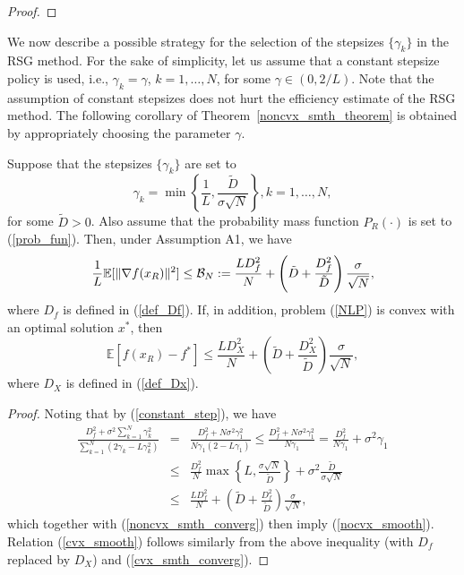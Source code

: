 \documentclass[final]{siamltex}
\newcommand{\beq}{\begin{equation}}
\newcommand{\eeq}{\end{equation}}
\newcommand{\beqa}{\begin{eqnarray}}
\newcommand{\eeqa}{\end{eqnarray}}
\newcommand{\beqas}{\begin{eqnarray*}}
\newcommand{\eeqas}{\end{eqnarray*}}
\def\eqnok#1{(\ref{#1})}
\def\vgap{\vspace*{.1in}}
\newcommand{\bbe}{\mathbb{E}}
\newcommand{\bbr}{\mathbb{R}}
\def\cB{{\cal B}}
\begin{document}
\begin{proof}
\end{proof}

\vgap

We now describe a possible strategy for the selection of the stepsizes $\{\gamma_k\}$
in the RSG method. For the sake of simplicity, let us assume that a constant
stepsize policy is used, i.e., $\gamma_k = \gamma$, $k = 1, \ldots, N$, for some $\gamma \in (0, 2/L)$.
Note that the assumption of constant stepsizes does not hurt the efficiency estimate of the
RSG method. The following corollary of Theorem~\ref{noncvx_smth_theorem} is obtained
by appropriately choosing the parameter $\gamma$.

\begin{corollary} \label{noncvx_smth_cor}
Suppose that the stepsizes $\{\gamma_k\}$ are set to
\beq \label{constant_step}
\gamma_k = \min \left\{ \frac{1}{L}, \frac{\tilde D}{\sigma \sqrt{N}}\right\}, k = 1, \ldots, N,
\eeq
for some $\tilde D > 0$. Also assume that the probability mass function $P_R(\cdot)$
is set to \eqnok{prob_fun}. Then, under Assumption A1, we have
\beq \label{nocvx_smooth}
\frac{1}{L} \bbe[\|\nabla f(x_R)\|^2] \le \cB_N:=
\frac{L D_f^2}{N} + \left(\tilde D + \frac{D_f^2}{\tilde D} \right) \frac{\sigma}{\sqrt{N}},
\eeq
where $D_f$ is defined in \eqnok{def_Df}.
If, in addition, problem \eqnok{NLP} is convex with an optimal solution $x^*$,
then
\beq \label{cvx_smooth}
\bbe[f(x_R) - f^*] \le \frac{L D_X^2}{N} + \left(\tilde D + \frac{D_X^2}{\tilde D} \right)
\frac{\sigma}{\sqrt{N}},
\eeq
where $D_X$ is defined in \eqnok{def_Dx}.
\end{corollary}

\begin{proof}
Noting that by \eqnok{constant_step}, we have
\beqas
\frac{D_f^2 + \sigma^2 {\sum_{k=1}^N \gamma_k^2}}{{\sum_{k=1}^N (2\gamma_k-L\gamma_k^2)}}
&=& \frac{D_f^2 + N \sigma^2 \gamma_1^2}{N \gamma_1 (2-L\gamma_1)}
\le \frac{D_f^2 + N \sigma^2 \gamma_1^2}{N \gamma_1} = \frac{D_f^2}{N \gamma_1} + \sigma^2 \gamma_1\\
&\le& \frac{D_f^2}{N} \max\left\{L, \frac{\sigma \sqrt{N}}{\tilde D} \right\}
+ \sigma^2 \frac{\tilde D}{\sigma \sqrt{N}} \\
&\le& \frac{L D_f^2}{N} + \left(\tilde D + \frac{D_f^2}{\tilde D} \right) \frac{\sigma}{\sqrt{N}},
\eeqas
which together with \eqnok{noncvx_smth_converg} then imply \eqnok{nocvx_smooth}.
Relation \eqnok{cvx_smooth} follows similarly from the above inequality (with $D_f$ replaced by $D_X$)
and \eqnok{cvx_smth_converg}.
\end{proof}
\end{document}
